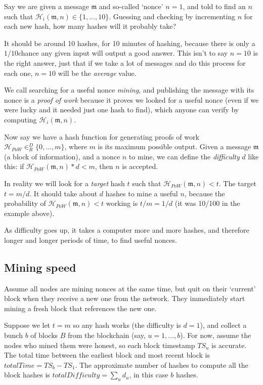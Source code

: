 Say we are given a message $\mathfrak{m}$ and so-called `nonce' $n = 1$, and told to find an $n$ such that $\mathcal{H}_i(\mathfrak{m},n) \in \{1,...,10\}$. Guessing and checking by incrementing $n$ for each new hash, how many hashes will it probably take?

It should be around 10 hashes, for 10 minutes of hashing, because there is only a $1/10$\nth chance any given input will output a good answer. This isn't to say $n = 10$ is the right answer, just that if we take a lot of messages and do this process for each one, $n = 10$ will be the {\em average} value. 

We call searching for a useful nonce {\em mining}, and publishing the message with its nonce is a {\em proof of work} because it proves we looked for a useful nonce (even if we were lucky and it needed just one hash to find), which anyone can verify by computing $\mathcal{H}_i(\mathfrak{m},n)$.

Now say we have a hash function for generating proofs of work $\mathcal{H}_{PoW} \in^D_R \{0,...,m\}$, where $m$ is its maximum possible output. Given a message $\mathfrak{m}$ (a block of information), and a nonce $n$ to mine, we can define the {\em difficulty} $d$ like this: if $\mathcal{H}_{PoW}(\mathfrak{m},n)*d < m$, then $n$ is accepted. 

In reality we will look for a {\em target} hash $t$ such that $\mathcal{H}_{PoW}(\mathfrak{m},n) < t$. The target $t = m/d$. It should take about $d$ hashes to mine a useful $n$, because the probability of $\mathcal{H}_{PoW}(\mathfrak{m},n) < t$ working is $t/m = 1/d$ (it was 10/100 in the example above).

As difficulty goes up, it takes a computer more and more hashes, and therefore longer and longer periods of time, to find useful nonces.


\subsection{Mining speed}

Assume all nodes are mining nonces at the same time, but quit on their `current' block when they receive a new one from the network. They immediately start mining a fresh block that references the new one.

Suppose we let $t = m$ so any hash works (the difficulty is $d = 1$), and collect a bunch $b$ of blocks $B$ from the blockchain (say, $u = 1,...,b$). For now, assume the nodes who mined them were honest, so each block timestamp ${TS}_u$ is accurate. The total time between the earliest block and most recent block is $\mathit{totalTime} = {TS}_b - {TS}_1$. The approximate number of hashes to compute all the block hashes is $\mathit{totalDifficulty} = \sum_u d_u$, in this case $b$ hashes.

